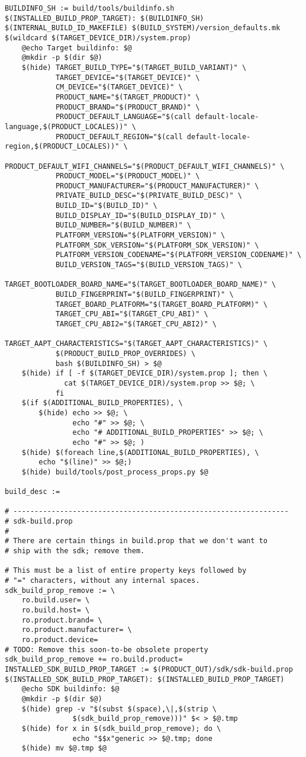 \documentclass[12pt,a4paper]{article}
\begin{document}
\begin{verbatim}
BUILDINFO_SH := build/tools/buildinfo.sh
$(INSTALLED_BUILD_PROP_TARGET): $(BUILDINFO_SH) $(INTERNAL_BUILD_ID_MAKEFILE) $(BUILD_SYSTEM)/version_defaults.mk $(wildcard $(TARGET_DEVICE_DIR)/system.prop)
	@echo Target buildinfo: $@
	@mkdir -p $(dir $@)
	$(hide) TARGET_BUILD_TYPE="$(TARGET_BUILD_VARIANT)" \
			TARGET_DEVICE="$(TARGET_DEVICE)" \
			CM_DEVICE="$(TARGET_DEVICE)" \
			PRODUCT_NAME="$(TARGET_PRODUCT)" \
			PRODUCT_BRAND="$(PRODUCT_BRAND)" \
			PRODUCT_DEFAULT_LANGUAGE="$(call default-locale-language,$(PRODUCT_LOCALES))" \
			PRODUCT_DEFAULT_REGION="$(call default-locale-region,$(PRODUCT_LOCALES))" \
			PRODUCT_DEFAULT_WIFI_CHANNELS="$(PRODUCT_DEFAULT_WIFI_CHANNELS)" \
			PRODUCT_MODEL="$(PRODUCT_MODEL)" \
			PRODUCT_MANUFACTURER="$(PRODUCT_MANUFACTURER)" \
			PRIVATE_BUILD_DESC="$(PRIVATE_BUILD_DESC)" \
			BUILD_ID="$(BUILD_ID)" \
			BUILD_DISPLAY_ID="$(BUILD_DISPLAY_ID)" \
			BUILD_NUMBER="$(BUILD_NUMBER)" \
			PLATFORM_VERSION="$(PLATFORM_VERSION)" \
			PLATFORM_SDK_VERSION="$(PLATFORM_SDK_VERSION)" \
			PLATFORM_VERSION_CODENAME="$(PLATFORM_VERSION_CODENAME)" \
			BUILD_VERSION_TAGS="$(BUILD_VERSION_TAGS)" \
			TARGET_BOOTLOADER_BOARD_NAME="$(TARGET_BOOTLOADER_BOARD_NAME)" \
			BUILD_FINGERPRINT="$(BUILD_FINGERPRINT)" \
			TARGET_BOARD_PLATFORM="$(TARGET_BOARD_PLATFORM)" \
			TARGET_CPU_ABI="$(TARGET_CPU_ABI)" \
			TARGET_CPU_ABI2="$(TARGET_CPU_ABI2)" \
			TARGET_AAPT_CHARACTERISTICS="$(TARGET_AAPT_CHARACTERISTICS)" \
			$(PRODUCT_BUILD_PROP_OVERRIDES) \
	        bash $(BUILDINFO_SH) > $@
	$(hide) if [ -f $(TARGET_DEVICE_DIR)/system.prop ]; then \
	          cat $(TARGET_DEVICE_DIR)/system.prop >> $@; \
	        fi
	$(if $(ADDITIONAL_BUILD_PROPERTIES), \
		$(hide) echo >> $@; \
		        echo "#" >> $@; \
		        echo "# ADDITIONAL_BUILD_PROPERTIES" >> $@; \
		        echo "#" >> $@; )
	$(hide) $(foreach line,$(ADDITIONAL_BUILD_PROPERTIES), \
		echo "$(line)" >> $@;)
	$(hide) build/tools/post_process_props.py $@

build_desc :=

# -----------------------------------------------------------------
# sdk-build.prop
#
# There are certain things in build.prop that we don't want to
# ship with the sdk; remove them.

# This must be a list of entire property keys followed by
# "=" characters, without any internal spaces.
sdk_build_prop_remove := \
	ro.build.user= \
	ro.build.host= \
	ro.product.brand= \
	ro.product.manufacturer= \
	ro.product.device=
# TODO: Remove this soon-to-be obsolete property
sdk_build_prop_remove += ro.build.product=
INSTALLED_SDK_BUILD_PROP_TARGET := $(PRODUCT_OUT)/sdk/sdk-build.prop
$(INSTALLED_SDK_BUILD_PROP_TARGET): $(INSTALLED_BUILD_PROP_TARGET)
	@echo SDK buildinfo: $@
	@mkdir -p $(dir $@)
	$(hide) grep -v "$(subst $(space),\|,$(strip \
				$(sdk_build_prop_remove)))" $< > $@.tmp
	$(hide) for x in $(sdk_build_prop_remove); do \
				echo "$$x"generic >> $@.tmp; done
	$(hide) mv $@.tmp $@


\end{verbatim}
\end{document}
